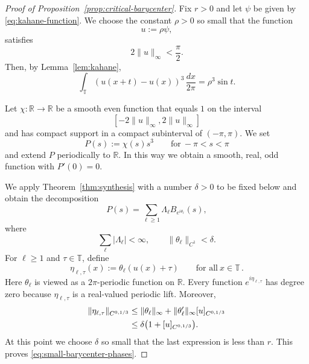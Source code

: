 \documentclass[11pt]{amsart}
\theoremstyle{definition}
\theoremstyle{remark}
\newcommand{\T}{\mathbb T}
\newcommand{\R}{\mathbb R}
\begin{document}
\begin{proof}[Proof of Proposition~\ref{prop:critical-barycenter}]
Fix $r>0$ and let $\psi$ be given by \eqref{eq:kahane-function}. We choose the constant $\rho>0$ so small that the function
\begin{equation}\label{eq:u-rho-psi}
 u:=\rho\psi,
\end{equation}
satisfies
\begin{equation}\label{eq:u-range-small}
 2\|u\|_\infty<\frac{\pi}{2}.
\end{equation}
Then, by Lemma~\ref{lem:kahane},
\begin{equation}\label{eq:u-cubic}
 \int_\T(u(x+t)-u(x))^3\,\frac{dx}{2\pi}
 =\rho^3\sin t.
\end{equation}

Let $\chi:\R\to\R$ be a smooth even function that equals $1$ on the interval
\[
 [-2\|u\|_\infty,2\|u\|_\infty]
\]
and has compact support in a compact subinterval of $(-\pi,\pi)$. We set
\begin{equation}\label{eq:P-cutoff}
 P(s):=\chi(s)s^3
 \qquad\text{for}\ -\pi<s<\pi
\end{equation}
and extend $P$ periodically to $\R$. In this way we obtain a smooth, real, odd function with $P'(0)=0$.

We apply Theorem~\ref{thm:synthesis} with a number $\delta>0$ to be fixed below and obtain the decomposition
\begin{equation}\label{eq:P-synthesis-barycenter}
 P(s)=\sum_{\ell\geq1}\Lambda_\ell B_{e^{i\theta_\ell}}(s),
\end{equation}
where
\begin{equation}\label{eq:barycenter-synthesis-bounds}
 \sum_\ell|\Lambda_\ell|<\infty,
 \qquad
 \|\theta_\ell\|_{C^1}<\delta.
\end{equation}
For $\ell\geq1$ and $\tau\in\T$, define
\begin{equation}\label{eq:h-composition}
 \eta_{\ell,\tau}(x):=\theta_\ell(u(x)+\tau)
 \qquad\text{for all}\ x\in\T \,.
\end{equation}
Here $\theta_\ell$ is viewed as a $2\pi$-periodic function on $\R$. Every function $e^{i\eta_{\ell,\tau}}$ has degree zero because $\eta_{\ell,\tau}$ is a real-valued periodic lift.  Moreover,
\begin{align}
 \|\eta_{\ell,\tau}\|_{C^{0,1/3}}
 &\leq\|\theta_\ell\|_\infty
 +\|\theta_\ell'\|_\infty[u]_{C^{0,1/3}}\notag\\
 &\leq\delta\big(1+[u]_{C^{0,1/3}}\big).\label{eq:composition-holder}
\end{align}
At this point we choose $\delta$ so small that the last expression is less than $r$.  This proves \eqref{eq:small-barycenter-phases}.


\end{proof}
\end{document}
